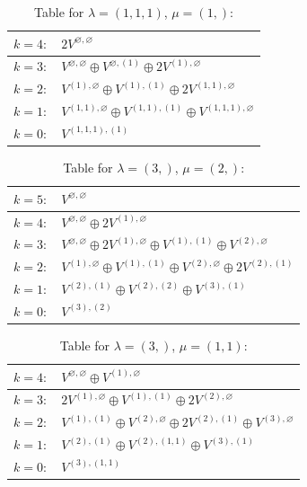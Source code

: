 \documentclass[a4paper,12pt]{article}
\begin{document}
\renewcommand{\arraystretch}{1.6} 
\begin{table}[H]
\centering
\caption{Table for $\lambda = (1, 1, 1)$, $\mu = (1,)$:}
\begin{tabular}{|>{\centering\arraybackslash}p{15cm}|}
\hline
 $k = 4: \quad 2 V^{\varnothing, \varnothing} $ \\ \hline
 $k = 3: \quad V^{\varnothing, \varnothing} \oplus V^{\varnothing, (1)} \oplus 2 V^{(1), \varnothing} $ \\ \hline
 $k = 2: \quad V^{(1), \varnothing} \oplus V^{(1), (1)} \oplus 2 V^{(1, 1), \varnothing} $ \\ \hline
 $k = 1: \quad V^{(1, 1), \varnothing} \oplus V^{(1, 1), (1)} \oplus V^{(1, 1, 1), \varnothing} $ \\ \hline
 $k = 0: \quad V^{(1, 1, 1), (1)} $ \\ \hline
\end{tabular}
\end{table}

\renewcommand{\arraystretch}{1.6} 
\begin{table}[H]
\centering
\caption{Table for $\lambda = (3,)$, $\mu = (2,)$:}
\begin{tabular}{|>{\centering\arraybackslash}p{15cm}|}
\hline
 $k = 5: \quad V^{\varnothing, \varnothing} $ \\ \hline
 $k = 4: \quad V^{\varnothing, \varnothing} \oplus 2 V^{(1), \varnothing} $ \\ \hline
 $k = 3: \quad V^{\varnothing, \varnothing} \oplus 2 V^{(1), \varnothing} \oplus V^{(1), (1)} \oplus V^{(2), \varnothing} $ \\ \hline
 $k = 2: \quad V^{(1), \varnothing} \oplus V^{(1), (1)} \oplus V^{(2), \varnothing} \oplus 2 V^{(2), (1)} $ \\ \hline
 $k = 1: \quad V^{(2), (1)} \oplus V^{(2), (2)} \oplus V^{(3), (1)} $ \\ \hline
 $k = 0: \quad V^{(3), (2)} $ \\ \hline
\end{tabular}
\end{table}

\renewcommand{\arraystretch}{1.6} 
\begin{table}[H]
\centering
\caption{Table for $\lambda = (3,)$, $\mu = (1, 1)$:}
\begin{tabular}{|>{\centering\arraybackslash}p{15cm}|}
\hline
 $k = 4: \quad V^{\varnothing, \varnothing} \oplus V^{(1), \varnothing} $ \\ \hline
 $k = 3: \quad 2 V^{(1), \varnothing} \oplus V^{(1), (1)} \oplus 2 V^{(2), \varnothing} $ \\ \hline
 $k = 2: \quad V^{(1), (1)} \oplus V^{(2), \varnothing} \oplus 2 V^{(2), (1)} \oplus V^{(3), \varnothing} $ \\ \hline
 $k = 1: \quad V^{(2), (1)} \oplus V^{(2), (1, 1)} \oplus V^{(3), (1)} $ \\ \hline
 $k = 0: \quad V^{(3), (1, 1)} $ \\ \hline
\end{tabular}
\end{table}
\end{document}
